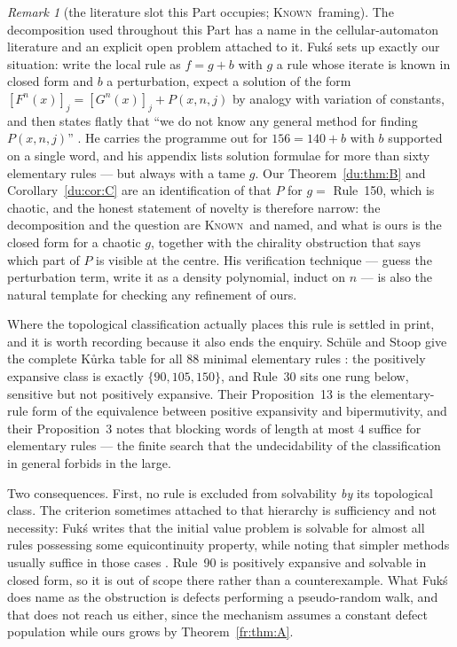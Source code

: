 \documentclass[11pt]{article}
\theoremstyle{definition}
\theoremstyle{remark}
\newtheorem{remark}[theorem]{Remark}
\newcommand{\KNOWN}{\textsc{Known}}
\begin{document}
\begin{remark}[the literature slot this Part occupies; \KNOWN\ framing]\label{du:fuks}
The decomposition used throughout this Part has a name in the cellular-automaton literature and an
explicit open problem attached to it. Fuk\'s \cite{Fuks25,Fuks23} sets up exactly our situation: write
the local rule as $f=g+b$ with $g$ a rule whose iterate is known in closed form and $b$ a perturbation,
expect a solution of the form $[F^n(x)]_j=[G^n(x)]_j+P(x,n,j)$ by analogy with variation of constants,
and then states flatly that ``we do not know any general method for finding $P(x,n,j)$''
\cite[\S2]{Fuks25}. He carries the programme out for $156=140+b$ with $b$ supported on a single word,
and his appendix lists solution formulae for more than sixty elementary rules --- but always with a
tame $g$. Our Theorem~\ref{du:thm:B} and Corollary~\ref{du:cor:C} are an identification of that $P$ for
$g=$ Rule~150, which is chaotic, and the honest statement of novelty is therefore narrow: the
decomposition and the question are \KNOWN\ and named, and what is ours is the closed form for a chaotic
$g$, together with the chirality obstruction that says which part of $P$ is visible at the centre. His
verification technique --- guess the perturbation term, write it as a density polynomial, induct on $n$
--- is also the natural template for checking any refinement of ours.

Where the topological classification actually places this rule is settled in print, and it is worth
recording because it also ends the enquiry. Sch\"ule and Stoop give the complete K\r{u}rka table for all
$88$ minimal elementary rules \cite{SS12}: the positively expansive class is exactly $\{90,105,150\}$,
and Rule~30 sits one rung below, sensitive but not positively expansive. Their Proposition~13 is the
elementary-rule form of the equivalence between positive expansivity and bipermutivity, and their
Proposition~3 notes that blocking words of length at most $4$ suffice for elementary rules --- the
finite search that the undecidability of the classification in general forbids in the large.

Two consequences. First, no rule is excluded from solvability \emph{by} its topological class. The
criterion sometimes attached to that hierarchy is sufficiency and not necessity: Fuk\'s writes that the
initial value problem is solvable for almost all rules possessing some equicontinuity property, while
noting that simpler methods usually suffice in those cases \cite[\S2]{Fuks25}. Rule~90 is positively
expansive and solvable in closed form, so it is out of scope there rather than a counterexample. What
Fuk\'s does name as the obstruction is defects performing a pseudo-random walk, and that does not reach
us either, since the mechanism assumes a constant defect population while ours grows by
Theorem~\ref{fr:thm:A}.


\end{remark}
\end{document}
